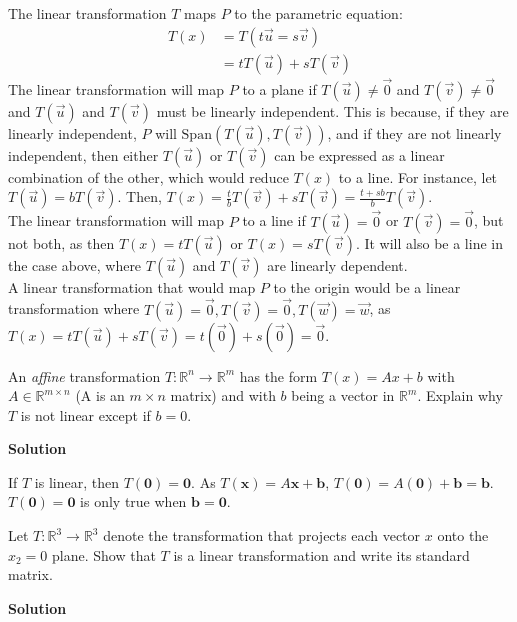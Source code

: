\documentclass[11pt]{scrartcl}
\theoremstyle{dotlessP}
\theoremstyle{dotlessN}
\begin{document}
The linear transformation $T$ maps $P$ to the parametric equation:
\begin{align*}
	T(x) &= T(t\vec{u} = s\vec{v}) \\
		 &= tT(\vec{u}) + sT(\vec{v})
\end{align*}
The linear transformation will map $P$ to a plane if $T(\vec{u}) \neq \vec{0}$ and $T(\vec{v}) \neq \vec{0}$ and $T(\vec{u})$ and $T(\vec{v})$ must be linearly independent. This is because, if they are linearly independent, $P$ will $\text{Span}(T(\vec{u}), T(\vec{v}))$, and if they are not linearly independent, then either $T(\vec{u})$ or $T(\vec{v})$ can be expressed as a linear combination of the other, which would reduce $T(x)$ to a line. For instance, let $T(\vec{u}) = bT(\vec{v})$. Then, $T(x) = \displaystyle\frac{t}{b}T(\vec{v}) + sT(\vec{v}) = \displaystyle\frac{t + sb}{b}T(\vec{v})$.
\\

The linear transformation will map $P$ to a line if  $T(\vec{u}) = \vec{0}$ or $T(\vec{v}) = \vec{0}$, but not both, as then $T(x) = tT(\vec{u})$ or $T(x) = sT(\vec{v})$. It will also be a line in the case above, where $T(\vec{u})$ and $T(\vec{v})$ are linearly dependent.
\\

A linear transformation that would map $P$ to the origin would be a linear transformation where $T(\vec{u}) = \vec{0}, T(\vec{v}) = \vec{0}, T(\vec{w}) = \vec{w}$, as $T(x) = tT(\vec{u}) + sT(\vec{v}) = t(\vec{0}) + s(\vec{0}) = \vec{0}$.
\\


\begin{ques}
	An \emph{affine} transformation $T: \mathbb{R}^n \to \mathbb{R}^m$ has the form $T(x) = Ax+b$ with $A \in \mathbb{R}^{m \times n}$ (A is an $m \times n$ matrix) and with $b$ being a vector in $\mathbb{R}^m$. Explain why $T$ is not linear except if $b = 0$. 
\end{ques}
\textbf{Solution}

If $T$ is linear, then $T(\bm{0}) = \bm{0}$. As $T(\bm{x}) = A\bm{x} + \bm{b}$, $T(\bm{0}) = A(\bm{0}) + \bm{b} = \bm{b}$. $T(\bm{0}) = \bm{0}$ is only true when $\bm{b} = \bm{0}$.
\begin{ques}
	Let $T: \mathbb{R}^3 \to \mathbb{R}^3$
denote the transformation that projects each vector $x$ onto the $x_2 = 0$ plane. Show that $T$ is a linear transformation and write its standard matrix.
\end{ques}
\textbf{Solution}
\end{document}
